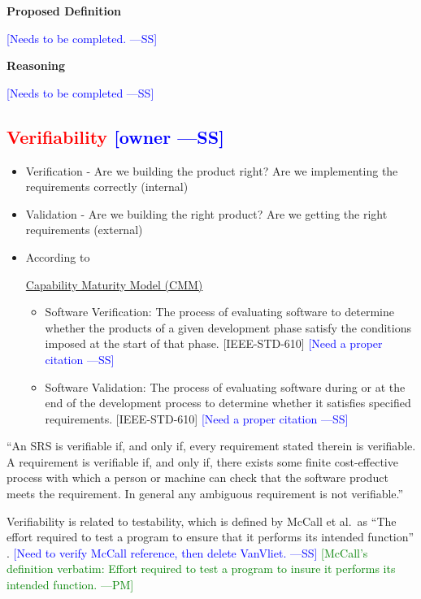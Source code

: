 \documentclass[letterpaper,cleveref]{lipics-v2019}
\newcommand{\authornote}[3]{\textcolor{#1}{[#3 ---#2]}}
\newcommand{\authornote}[3]{}
\newcommand{\wss}[1]{\authornote{blue}{SS}{#1}} %
\newcommand{\pmi}[1]{\authornote{green}{PM}{#1}} %
\newcommand{\notdone}[1]{\textcolor{red}{#1}}
\theoremstyle{definition}
\begin{document}
\noindent \textbf{Proposed Definition} 

\wss{Needs to be completed.}

\noindent \textbf{Reasoning}

\wss{Needs to be completed}

\subsection{\notdone{Verifiability} \wss{owner}}

\begin{itemize}
	
\item Verification - Are we building the product right?  Are we implementing the
  requirements correctly (internal)
\item Validation - Are we building the right product? Are we getting the right
  requirements (external)
\item According to
	
  \href{https://en.wikipedia.org/wiki/Software_verification_and_validation}{Capability
    Maturity Model (CMM)}
  \begin{itemize}
  \item Software Verification: The process of evaluating software to determine
    whether the products of a given development phase satisfy the conditions
    imposed at the start of that phase. [IEEE-STD-610] \wss{Need a proper
      citation}
  \item Software Validation: The process of evaluating software during or at the
    end of the development process to determine whether it satisfies specified
    requirements. [IEEE-STD-610] \wss{Need a proper citation}
  \end{itemize}
\end{itemize}

``An SRS is verifiable if, and only if, every requirement stated therein is
verifiable. A requirement is verifiable if, and only if, there exists some
finite cost-effective process with which a person or machine can check that the
software product meets the requirement. In general any ambiguous requirement is
not verifiable.'' \citep{IEEE1998}

Verifiability is related to testability, which is defined by McCall et al.\ as
``The effort required to test a program to ensure that it performs its intended
function'' \citep{VanVliet2000}. \wss{Need to verify McCall reference, then
  delete VanVliet.} \pmi{McCall's definition verbatim: Effort required to test a program to insure it performs its intended function.}
\end{document}
